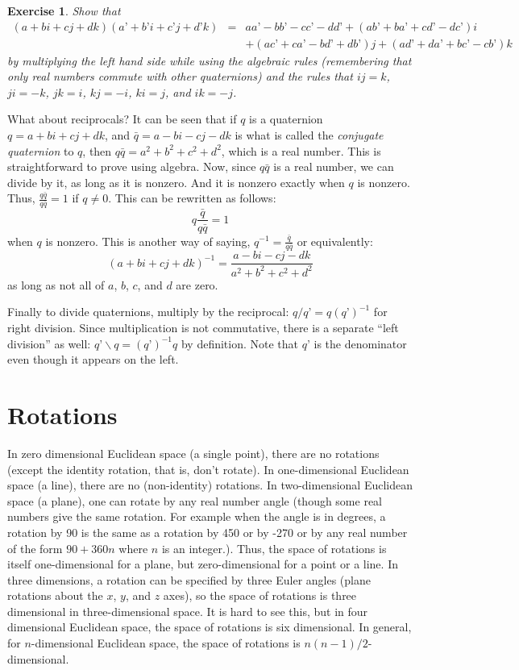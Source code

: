 \documentclass[letter,12pt]{article}
\newtheorem{exercise}{Exercise}
\begin{document}
\begin{exercise}
Show that 
\begin{eqnarray*}
(a + bi + cj + dk)(a’ + b’i + c’j + d’k) &=& aa’ - bb’ - cc’ - dd’  + (ab’ + ba’ + cd’ - dc’)i\\ 
&&+ (ac’ + ca’ - bd’ + db’)j + (ad’ + da’ + bc’ - cb’)k
\end{eqnarray*}
by multiplying the left hand side while using the algebraic rules (remembering that only real numbers commute with other quaternions) and the rules that $ij=k$, $ji=-k$, $jk=i$, $kj=-i$, $ki=j$, and $ik=-j$.  
\end{exercise}

What about reciprocals? It can be seen that if $q$ is a quaternion $q=a+bi+cj+dk$, and $\bar{q}=a-bi-cj-dk$ is what is called the \emph{conjugate quaternion} to $q$,  then $q\bar{q} = a^2+b^2+c^2+d^2$, which is a real number.  This is straightforward to prove using algebra.  Now, since $q\bar{q}$ is a real number, we can divide by it, as long as it is nonzero.  And it is nonzero exactly when $q$ is nonzero.  Thus, $\frac{q\bar{q}}{q\bar{q}}=1$ if $q\ne{0}$.  This can be rewritten as follows:
\[
q\frac{\bar{q}}{q\bar{q}} = 1
\]
when $q$ is nonzero.  This is another way of saying, $q^{-1} = \frac{\bar{q}}{q\bar{q}}$ or equivalently:
\[
(a+bi+cj+dk)^{-1} = \frac{a-bi-cj-dk}{a^2+b^2+c^2+d^2}
\]
as long as not all of $a$, $b$, $c$, and $d$ are zero.

Finally to divide quaternions, multiply by the reciprocal:  $q/q’ = q(q’)^{-1}$ for right division.  Since multiplication is not commutative, there is a separate “left division” as well: $q’\backslash{q} = (q’)^{-1}q$ by definition.  Note that $q’$ is the denominator even though it appears on the left.

\section{Rotations}
In zero dimensional Euclidean space (a single point), there are no rotations (except the identity rotation, that is, don’t rotate).  In one-dimensional Euclidean space (a line), there are no (non-identity) rotations.  In two-dimensional Euclidean space (a plane), one can rotate by any real number angle (though some real numbers give the same rotation.  For example when the angle is in degrees, a rotation by 90 is the same as a rotation by 450 or by -270 or by any real number of the form $90 + 360n$ where $n$ is an integer.).  Thus, the space of rotations is itself one-dimensional for a plane, but zero-dimensional for a point or a line.  In three dimensions, a rotation can be specified by three Euler angles (plane rotations about the $x$, $y$, and $z$ axes), so the space of rotations is three dimensional in three-dimensional space.  It is hard to see this, but in four dimensional Euclidean space, the space of rotations is six dimensional.  In general, for $n$-dimensional Euclidean space, the space of rotations is $n(n-1)/2$-dimensional.
\end{document}
